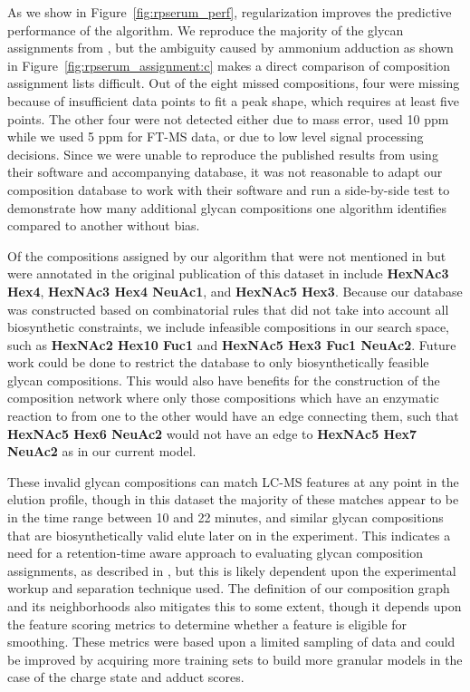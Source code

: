     As we show in Figure~\ref{fig:rpserum_perf}, regularization improves the
    predictive performance of the algorithm.  We reproduce the majority
    of the glycan assignments from \cite{Yu2013}, but the ambiguity caused
    by ammonium adduction as shown in Figure~\ref{fig:rpserum_assignment:c}
    makes a direct comparison of composition assignment lists difficult. Out
    of the eight missed compositions, four were missing because of insufficient
    data points to fit a peak shape, which requires at least five points. The
    other four were not detected either due to mass error, \cite{Yu2013}
    used 10 ppm while we used 5 ppm for FT-MS data, or due to low level signal
    processing decisions. Since we were unable to reproduce the published results
    from \cite{Yu2013} using their software and accompanying database, it was not
    reasonable to adapt our composition database to work with their software and
    run a side-by-side test to demonstrate how many additional glycan compositions
    one algorithm identifies compared to another without bias.

    Of the compositions assigned by our algorithm that were not
    mentioned in \cite{Yu2013} but were annotated in the original publication
    of this dataset in \cite{Hu2012} include \textbf{HexNAc3 Hex4},
    \textbf{HexNAc3 Hex4 NeuAc1}, and \textbf{HexNAc5 Hex3}. Because our database
    was constructed based on combinatorial rules that did not take into account
    all biosynthetic constraints, we include infeasible compositions in our search
    space, such as \textbf{HexNAc2 Hex10 Fuc1} and \textbf{HexNAc5 Hex3 Fuc1 NeuAc2}.
    Future work could be done to restrict the database to only biosynthetically
    feasible glycan compositions. This would also have benefits for the construction
    of the composition network where only those compositions which have an enzymatic
    reaction to from one to the other would have an edge connecting them, such that
    \textbf{HexNAc5 Hex6 NeuAc2} would not have an edge to \textbf{HexNAc5 Hex7 NeuAc2}
    as in our current model.
    
    These invalid glycan compositions can match LC-MS features at any point in
    the elution profile, though in this dataset the majority of these matches
    appear to be in the time range between 10 and 22 minutes, and similar glycan
    compositions that are biosynthetically valid elute later on in the experiment.
    This indicates a need for a retention-time aware approach to evaluating glycan
    composition assignments, as described in \cite{Hu2016}, but this is likely dependent
    upon the experimental workup and separation technique used. The definition of our
    composition graph and its neighborhoods also mitigates this to some extent, though
    it depends upon the feature scoring metrics to determine whether a feature is
    eligible for smoothing. These metrics were based upon a limited sampling of data
    and could be improved by acquiring more training sets to build more granular
    models in the case of the charge state and adduct scores.

